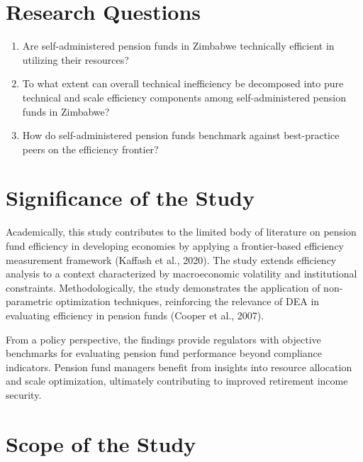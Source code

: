 \documentclass[12pt,a4paper]{article}
\begin{document}
\section{Research Questions}

\begin{enumerate}[noitemsep]
    \item Are self-administered pension funds in Zimbabwe technically efficient in utilizing their resources?
    \item To what extent can overall technical inefficiency be decomposed into pure technical and scale efficiency components among self-administered pension funds in Zimbabwe?
    \item How do self-administered pension funds benchmark against best-practice peers on the efficiency frontier?
\end{enumerate}

\section{Significance of the Study}

Academically, this study contributes to the limited body of literature on pension fund efficiency in developing economies by applying a frontier-based efficiency measurement framework (Kaffash et al., 2020). The study extends efficiency analysis to a context characterized by macroeconomic volatility and institutional constraints. Methodologically, the study demonstrates the application of non-parametric optimization techniques, reinforcing the relevance of DEA in evaluating efficiency in pension funds (Cooper et al., 2007).

From a policy perspective, the findings provide regulators with objective benchmarks for evaluating pension fund performance beyond compliance indicators. Pension fund managers benefit from insights into resource allocation and scale optimization, ultimately contributing to improved retirement income security.

\section{Scope of the Study}
\end{document}
